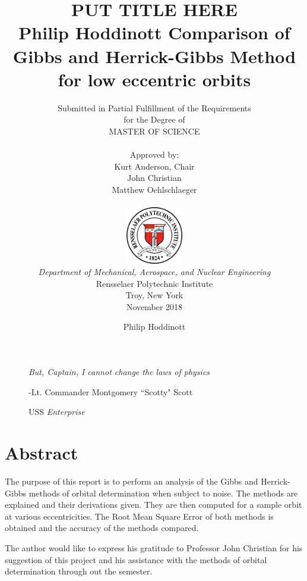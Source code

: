 \documentclass[12pt]{article}
\title{ 
		\LARGE \textbf{\uppercase{Put Title Here}} \\
		\vspace{0.25cm}
		\LARGE \textbf{Philip Hoddinott}
	}
\author{\small{Submitted in Partial Fulfillment of the Requirements} \\ \small{for the Degree of} \\
		\uppercase{Master of Science} \\ \\
		Approved by:
		\\ Kurt Anderson, Chair \\ John Christian \\ Matthew Oehlschlaeger \\ \\ %
		\includegraphics[width=2.5cm]{rensselaer_seal.png} \\
		\small{\textit{Department of Mechanical, Aerospace, and Nuclear Engineering}} \\
		\small{Rensselaer Polytechnic Institute} \\ 
		\small{Troy, New York} \\
		\small{November 2018}
	}
\newlength\longest
\begin{document}
		\title{Comparison of Gibbs and Herrick-Gibbs Method for low eccentric orbits}
	\author{Philip Hoddinott}
	
	\maketitle
	\thispagestyle{empty}
	\clearpage
	
	\thispagestyle{empty}
	\null\vfill
	
	\begin{figure}[!t]
		\begin{center}
			\settowidth{}
			\parbox{\longest}{%
				\raggedright{\huge\itshape%
					But, Captain, I cannot change the laws of physics\par\bigskip
				}   
				\raggedleft\Large{-Lt. Commander Montgomery ``Scotty" Scott}\par
				\raggedleft\Large{USS}\textit{ Enterprise}\par%
				
			}
		\end{center}
	\end{figure}
	
	
	\null\vfill
	
	\newpage
	\tableofcontents
	
	\newpage


	
	\listoffigures
	
	\newpage
		\doublespacing

	
	
	\newpage
	\section*{Abstract}
	The purpose of this report is to perform an analysis of the Gibbs and Herrick-Gibbs methods of orbital determination when subject to noise. The methods are explained and their derivations given. They are then computed for a sample orbit at various eccentricities. The Root Mean Square Error of both methods is obtained and the accuracy of the methods compared. \par 
	The author would like to express his gratitude to Professor John Christian for his suggestion of this project and his assistance with the methods of orbital determination through out the semester.\par 
	
\end{document}
